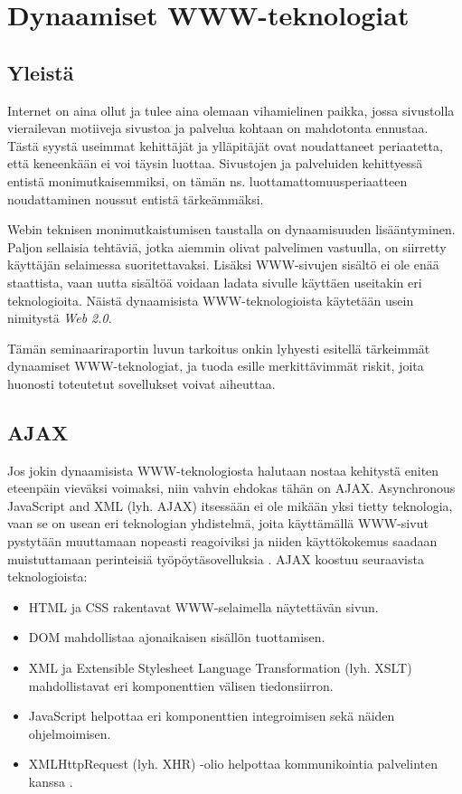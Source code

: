 
\ifdefined\seminaari
\relax
\else
\chapter{Dynaamiset WWW-teknologiat}
\fi

\section{Yleistä}

Internet on aina ollut ja tulee aina olemaan vihamielinen paikka, jossa sivustolla vierailevan motiiveja sivustoa ja palvelua kohtaan on mahdotonta ennustaa. Tästä syystä 
useimmat kehittäjät ja ylläpitäjät ovat noudattaneet periaatetta, että keneenkään ei voi täysin luottaa. Sivustojen ja palveluiden kehittyessä entistä monimutkaisemmiksi,
on tämän ns. luottamattomuusperiaatteen noudattaminen noussut entistä
tärkeämmäksi.

Webin teknisen monimutkaistumisen taustalla on dynaamisuuden
lisääntyminen. Paljon sellaisia tehtäviä, jotka aiemmin olivat
palvelimen vastuulla, on siirretty käyttäjän selaimessa
suoritettavaksi. Lisäksi WWW-sivujen sisältö ei ole enää staattista,
vaan uutta sisältöä voidaan ladata sivulle käyttäen useitakin eri
teknologioita. Näistä dynaamisista WWW-teknologioista käytetään
usein nimitystä \emph{Web 2.0}.

Tämän \ifdefined\seminaari seminaariraportin \else luvun \fi tarkoitus
onkin lyhyesti esitellä tärkeimmät dynaamiset WWW-teknologiat, ja
tuoda esille merkittävimmät riskit, joita huonosti toteutetut
sovellukset voivat aiheuttaa.

\section {AJAX}

Jos jokin dynaamisista WWW-teknologiosta halutaan nostaa kehitystä
eniten eteenpäin vieväksi voimaksi, niin vahvin ehdokas tähän on AJAX.
Asynchronous JavaScript and XML (lyh. AJAX) itsessään ei ole mikään
yksi tietty teknologia, vaan se on usean eri teknologian yhdistelmä,
joita käyttämällä WWW-sivut pystytään muuttamaan nopeasti reagoiviksi
ja niiden käyttökokemus saadaan muistuttamaan perinteisiä
työpöytäsovelluksia \cite{AJAX}. AJAX koostuu seuraavista
teknologioista:

\begin{itemize}
\item HTML ja CSS rakentavat WWW-selaimella näytettävän sivun.
\item DOM mahdollistaa ajonaikaisen sisällön tuottamisen.
\item XML ja Extensible Stylesheet Language Transformation (lyh. XSLT)
  mahdollistavat eri komponenttien välisen tiedonsiirron.
\item JavaScript helpottaa eri komponenttien integroimisen sekä näiden
  ohjelmoimisen.
\item XMLHttpRequest (lyh. XHR) -olio helpottaa kommunikointia
  palvelinten kanssa \cite{WEB2b}.
\end{itemize}


